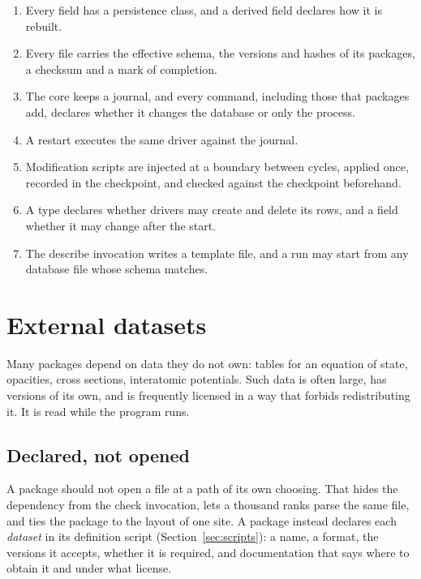 \documentclass[11pt,a4paper]{article}
\begin{document}
\begin{enumerate}
  \item Every field has a persistence class, and a derived field declares
        how it is rebuilt.
  \item Every file carries the effective schema, the versions and hashes of
        its packages, a checksum and a mark of completion.
  \item The core keeps a journal, and every command, including those that
        packages add, declares whether it changes the database or only the
        process.
  \item A restart executes the same driver against the journal.
  \item Modification scripts are injected at a boundary between cycles,
        applied once, recorded in the checkpoint, and checked against the
        checkpoint beforehand.
  \item A type declares whether drivers may create and delete its rows, and
        a field whether it may change after the start.
  \item The describe invocation writes a template file, and a run may start
        from any database file whose schema matches.
\end{enumerate}

\section{External datasets}
\label{sec:datasets}

Many packages depend on data they do not own: tables for an equation of
state, opacities, cross sections, interatomic potentials.  Such data is
often large, has versions of its own, and is frequently licensed in a way
that forbids redistributing it.  It is read while the program runs.

\subsection{Declared, not opened}

A package should not open a file at a path of its own choosing.  That
hides the dependency from the check invocation, lets a thousand ranks parse
the same file, and ties the package to the layout of one site.  A package
instead declares each \emph{dataset} in its definition script
(Section~\ref{sec:scripts}): a name, a format, the versions it accepts,
whether it is required, and documentation that says where to obtain it and
under what license.
\end{document}
